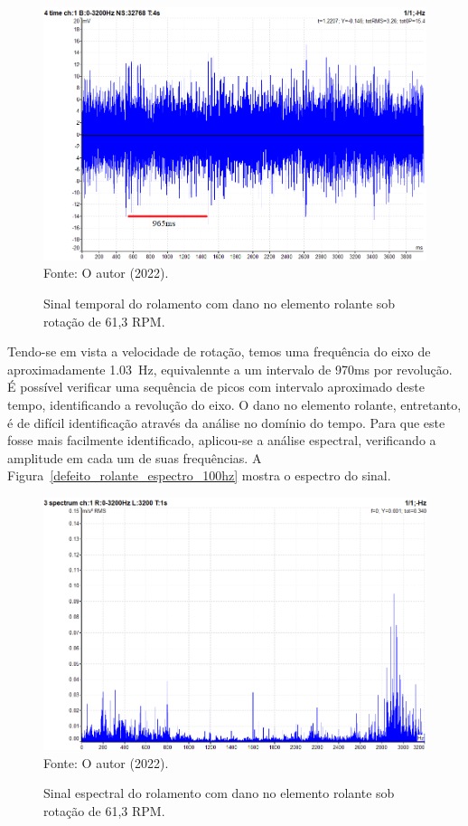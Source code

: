 \documentclass[
	12pt,				
	oneside,			
	a4paper,			
	english,			
	brazil,			
	]{abntex2ppgsi}
\begin{document}
\begin{figure}[H]
\centering
\caption {Sinal temporal do rolamento com dano no elemento rolante sob rotação de 61,3 RPM.}
\includegraphics[width=\textwidth,keepaspectratio]{dominio_tempo_defeito_rolante_acelerometro_100hz_anotado} \\
Fonte: O autor (2022).
\label{dominio_tempo_defeito_rolante_acelerometro_100hz_anotado}
\end{figure}

Tendo-se em vista a velocidade de rotação, temos uma frequência do eixo de aproximadamente \SI{1,03}{\hertz}, equivalennte a um intervalo de 970ms por revolução. É possível verificar uma sequência de picos com intervalo aproximado deste tempo, identificando a revolução do eixo. O dano no elemento rolante, entretanto, é de difícil identificação através da análise no domínio do tempo. Para que este fosse mais facilmente identificado, aplicou-se a análise espectral, verificando a amplitude em cada um de suas frequências. A Figura~\ref{defeito_rolante_espectro_100hz} mostra o espectro do sinal. 

\begin{figure}[H]
\centering
\caption {Sinal espectral do rolamento com dano no elemento rolante sob rotação de 61,3 RPM.}
\includegraphics[width=\textwidth,keepaspectratio]{ESPECTRO_ROLAMENTO_DEFEITO_ROLANTE_100HZ} \\
Fonte: O autor (2022).
\label{ESPECTRO_ROLAMENTO_DEFEITO_ROLANTE_100HZ}
\end{figure}
\end{document}

